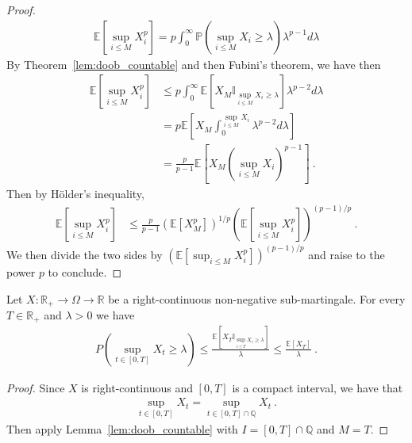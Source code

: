 \begin{proof}
\begin{align*}
  \mathbb{E}\left[ \sup_{i \le M}X_i^p \right]
  = p \int_0^\infty \mathbb{P}\left( \sup_{i \le M}X_i \geq \lambda \right) \lambda^{p-1} d\lambda
\end{align*}
By Theorem~\ref{lem:doob_countable} and then Fubini's theorem, we have then
\begin{align*}
  \mathbb{E}\left[ \sup_{i \le M}X_i^p \right]
  &\le p \int_0^\infty \mathbb{E}\left[X_M \mathbb{I}_{\sup_{i \le M}X_i \ge \lambda}\right] \lambda^{p-2} d\lambda
  \\
  &= p \mathbb{E}\left[X_M \int_0^{\sup_{i \le M}X_i} \lambda^{p-2} d\lambda\right]
  \\
  &= \frac{p}{p - 1} \mathbb{E}\left[X_M (\sup_{i \le M}X_i)^{p-1}\right]
  \: .
\end{align*}
Then by Hölder's inequality,
\begin{align*}
  \mathbb{E}\left[ \sup_{i \le M}X_i^p \right]
  &\le \frac{p}{p - 1} \left(\mathbb{E}[X_M^p]\right)^{1/p} \left(\mathbb{E}\left[\sup_{i \le M}X_i^p \right]\right)^{(p-1)/p}
  \: .
\end{align*}
We then divide the two sides by $\left(\mathbb{E}\left[\sup_{i \le M}X_i^p \right]\right)^{(p-1)/p}$ and raise to the power $p$ to conclude.
\end{proof}


\begin{theorem}\label{thm:doob_ineq}
  \leanok
  Let $X: \mathbb{R}_+ \to \Omega \to \mathbb{R}$ be a right-continuous non-negative sub-martingale.
  For every $T \in \mathbb{R}_+$ and $\lambda>0$ we have
  \begin{align*}
    P\left( \sup_{t\in[0,T]}X_t \geq \lambda \right)
    \leq \frac{\mathbb{E}[X_T \mathbb{I}_{\sup_{i \le T}X_i \ge \lambda}]}{\lambda}
    \leq \frac{\mathbb{E}[X_T]}{\lambda}
    \: .
  \end{align*}
\end{theorem}

\begin{proof}
Since $X$ is right-continuous and $[0,T]$ is a compact interval, we have that
\begin{align*}
  \sup_{t\in[0,T]}X_t = \sup_{t\in[0,T] \cap \mathbb{Q}}X_t
  \: .
\end{align*}
Then apply Lemma~\ref{lem:doob_countable} with $I = [0,T] \cap \mathbb{Q}$ and $M = T$.
\end{proof}


